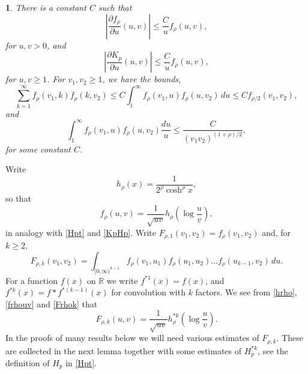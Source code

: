 \documentclass{article}
\numberwithin{equation}{section}
\numberwithin{figure}{section}
\theoremstyle{plain}
\theoremstyle{plain}
\newtheorem{lemma}[thm]{\protect\lemmaname}
\numberwithin{thm}{section}
\theoremstyle{remark}
\providecommand{\lemmaname}{Lemma}
\newcommand{\R}{\mathbb{R}}
\let \le \leqslant
\let \ge \geqslant
\begin{document}
\begin{lemma}\label{Lem:frhobounds}
There is a constant $C$ such that
\begin{equation}\label{dfrho}
    \left|\frac{\partial f_\rho}{\partial u}(u,v)\right|\le\frac{C}{u}
    f_\rho(u,v),
\end{equation}
for $u,v>0$, and
\begin{equation}\label{dKp}
    \left|\frac{\partial K_p}{\partial u}(u,v)\right|\le\frac{C}{u}
    f_\rho(u,v),
\end{equation}
for $u,v\ge 1$. 
For $v_1,v_2\ge 1$, we have the bounds,
\begin{equation}\label{frhob1}
\sum_{k=1}^\infty f_\rho(v_1,k)f_\rho(k,v_2)\le C\int_1^\infty f_\rho(v_1,u)f_\rho(u,v_2)\,du\le Cf_{\rho/2}(v_1,v_2),
\end{equation}
and
\begin{equation}\label{frhob2}
\int_1^\infty f_\rho(v_1,u)f_\rho(u,v_2)\frac{du}u\le\frac C{(v_1v_2)^{(1+\rho)/2}},
\end{equation}
for some constant $C$.
\end{lemma}
Write
\begin{equation}\label{hrho}
h_\rho(x)=\frac 1{2^\rho\cosh^\rho x},
\end{equation}
so that
\begin{equation}\label{frhouv}
    f_\rho(u,v)=\frac{1}{\sqrt{uv}} h_{\rho}(\log\frac uv),
\end{equation}
in analogy with \eqref{Hpt} and \eqref{KpHp}.
Write $F_{\rho,1}(v_1,v_2)=f_\rho(v_1,v_2)$ and, for $k\ge 2$, 
\begin{equation}\label{Frhok}
F_{\rho,k}(v_1,v_2)=\int_{[0,\infty)^{k-1}}f_\rho(v_1,u_1)f_\rho(u_1,u_2)\dots f_\rho(u_{k-1},v_2)\,du.
\end{equation}
For a function $f(x)$ on $\R$ we write $f^{*1}(x)=f(x)$, and
$f^{*k}(x)=f*f^{*(k-1)}(x)$ for convolution with $k$ factors.
We see from \eqref{hrho}, \eqref{frhouv} and \eqref{Frhok} that
\begin{equation}\label{Frhokstar}
    F_{\rho,k}(u,v)=\frac 1{\sqrt{uv}}h_\rho^{*k}(\log\frac uv).
\end{equation}
In the proofs of many results below we will need various estimates of $F_{\rho,k}$. These are collected in the next lemma together with some estimates of $H_p^{*k}$, see the definition of $H_p$ in \eqref{Hpt}.
\end{document}
